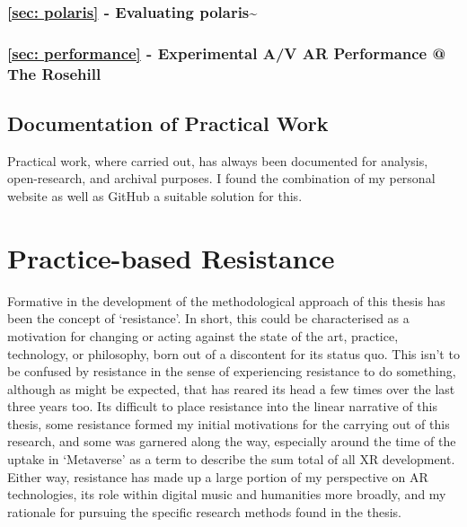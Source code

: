 \subsubsection{\autoref{sec: polaris} - Evaluating polaris\textasciitilde{}}


\subsubsection{\autoref{sec: performance} - Experimental A/V AR Performance @ The Rosehill}


\subsection{Documentation of Practical Work}\label{sec: method-outline-documentation}
Practical work, where carried out, has always been documented for analysis, open-research, and archival purposes. I found the combination of my personal website as well as GitHub a suitable solution for this.



\section{Practice-based Resistance}\label{sec: method-resistance}
Formative in the development of the methodological approach of this thesis has been the concept of `resistance'. In short, this could be characterised as a motivation for changing or acting against the state of the art, practice, technology, or philosophy, born out of a discontent for its status quo. This isn't to be confused by resistance in the sense of experiencing resistance to do something, although as might be expected, that has reared its head a few times over the last three years too. Its difficult to place resistance into the linear narrative of this thesis, some resistance formed my initial motivations for the carrying out of this research, and some was garnered along the way, especially around the time of the uptake in `Metaverse' as a term to describe the sum total of all XR development. Either way, resistance has made up a large portion of my perspective on AR technologies, its role within digital music and humanities more broadly, and my rationale for pursuing the specific research methods found in the thesis.

